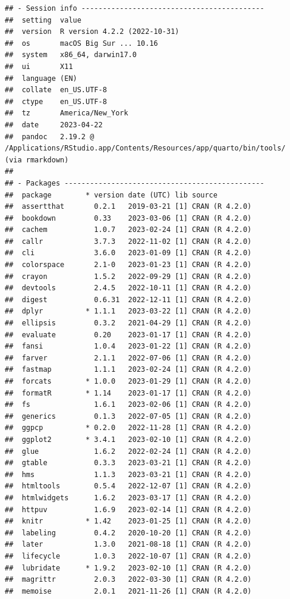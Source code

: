 \documentclass[print]{nuthesis}
\begin{document}
\begin{verbatim}
## - Session info -------------------------------------------
##  setting  value
##  version  R version 4.2.2 (2022-10-31)
##  os       macOS Big Sur ... 10.16
##  system   x86_64, darwin17.0
##  ui       X11
##  language (EN)
##  collate  en_US.UTF-8
##  ctype    en_US.UTF-8
##  tz       America/New_York
##  date     2023-04-22
##  pandoc   2.19.2 @ /Applications/RStudio.app/Contents/Resources/app/quarto/bin/tools/ (via rmarkdown)
## 
## - Packages -----------------------------------------------
##  package        * version date (UTC) lib source
##  assertthat       0.2.1   2019-03-21 [1] CRAN (R 4.2.0)
##  bookdown         0.33    2023-03-06 [1] CRAN (R 4.2.0)
##  cachem           1.0.7   2023-02-24 [1] CRAN (R 4.2.0)
##  callr            3.7.3   2022-11-02 [1] CRAN (R 4.2.0)
##  cli              3.6.0   2023-01-09 [1] CRAN (R 4.2.0)
##  colorspace       2.1-0   2023-01-23 [1] CRAN (R 4.2.0)
##  crayon           1.5.2   2022-09-29 [1] CRAN (R 4.2.0)
##  devtools         2.4.5   2022-10-11 [1] CRAN (R 4.2.0)
##  digest           0.6.31  2022-12-11 [1] CRAN (R 4.2.0)
##  dplyr          * 1.1.1   2023-03-22 [1] CRAN (R 4.2.0)
##  ellipsis         0.3.2   2021-04-29 [1] CRAN (R 4.2.0)
##  evaluate         0.20    2023-01-17 [1] CRAN (R 4.2.0)
##  fansi            1.0.4   2023-01-22 [1] CRAN (R 4.2.0)
##  farver           2.1.1   2022-07-06 [1] CRAN (R 4.2.0)
##  fastmap          1.1.1   2023-02-24 [1] CRAN (R 4.2.0)
##  forcats        * 1.0.0   2023-01-29 [1] CRAN (R 4.2.0)
##  formatR        * 1.14    2023-01-17 [1] CRAN (R 4.2.0)
##  fs               1.6.1   2023-02-06 [1] CRAN (R 4.2.0)
##  generics         0.1.3   2022-07-05 [1] CRAN (R 4.2.0)
##  ggpcp          * 0.2.0   2022-11-28 [1] CRAN (R 4.2.0)
##  ggplot2        * 3.4.1   2023-02-10 [1] CRAN (R 4.2.0)
##  glue             1.6.2   2022-02-24 [1] CRAN (R 4.2.0)
##  gtable           0.3.3   2023-03-21 [1] CRAN (R 4.2.0)
##  hms              1.1.3   2023-03-21 [1] CRAN (R 4.2.0)
##  htmltools        0.5.4   2022-12-07 [1] CRAN (R 4.2.0)
##  htmlwidgets      1.6.2   2023-03-17 [1] CRAN (R 4.2.0)
##  httpuv           1.6.9   2023-02-14 [1] CRAN (R 4.2.0)
##  knitr          * 1.42    2023-01-25 [1] CRAN (R 4.2.0)
##  labeling         0.4.2   2020-10-20 [1] CRAN (R 4.2.0)
##  later            1.3.0   2021-08-18 [1] CRAN (R 4.2.0)
##  lifecycle        1.0.3   2022-10-07 [1] CRAN (R 4.2.0)
##  lubridate      * 1.9.2   2023-02-10 [1] CRAN (R 4.2.0)
##  magrittr         2.0.3   2022-03-30 [1] CRAN (R 4.2.0)
##  memoise          2.0.1   2021-11-26 [1] CRAN (R 4.2.0)

\end{verbatim}
\end{document}
